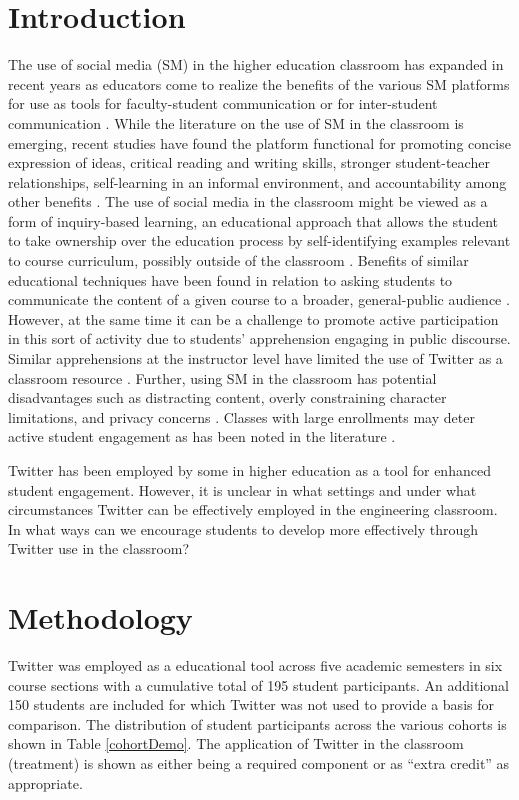 \documentclass[12pt]{article}
\begin{document}
\section*{Introduction}
The use of social media (SM) in the higher education classroom has expanded in recent years as educators come to realize the benefits of the various SM platforms for use as tools for faculty-student communication or for inter-student communication \cite{blessing_using_2012}. While the literature on the use of SM in the classroom is emerging, recent studies have found the platform functional for promoting concise expression of ideas, critical reading and writing skills, stronger student-teacher relationships, self-learning in an informal environment, and accountability among other benefits \cite{shiffman_twitter_2012}. The use of social media in the classroom might be viewed as a form of inquiry-based learning, an educational approach that allows the student to take ownership over the education process by self-identifying examples relevant to course curriculum, possibly outside of the classroom \cite{magnussen_impact_2000, prince_does_2004}. Benefits of similar educational techniques have been found in relation to asking students to communicate the content of a given course to a broader, general-public audience \cite{junco_effect_2011, ha_influence_2013}. However, at the same time it can be a challenge to promote active participation in this sort of activity due to students’ apprehension engaging in public discourse. Similar apprehensions at the instructor level have limited the use of Twitter as a classroom resource \cite{carpenter_how_2014}. Further, using SM in the classroom has potential disadvantages such as distracting content, overly constraining character limitations, and privacy concerns \cite{dhir_tweeters_2013}. Classes with large enrollments may deter active student engagement as has been noted in the literature \cite{ahlfeldt_measurement_2005}.  

Twitter has been employed by some in higher education as a tool for enhanced student engagement. However, it is unclear in what settings and under what circumstances Twitter can be effectively employed in the engineering classroom. In what ways can we encourage students to develop more effectively through Twitter use in the classroom?


\section*{Methodology}
Twitter was employed as a educational tool across five academic semesters in six course sections with a cumulative total of 195 student participants. An additional 150 students are included for which Twitter was not used to provide a basis for comparison. The distribution of student participants across the various cohorts is shown in Table \ref{cohortDemo}. The application of Twitter in the classroom (treatment) is shown as either being a required component or as ``extra credit'' as appropriate.
\end{document}
